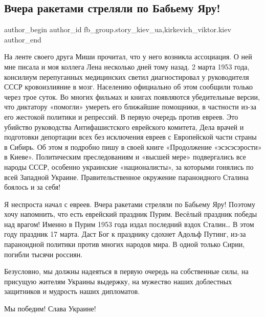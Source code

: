  
 
 
 
 
 
\subsection{Вчера ракетами стреляли по Бабьему Яру!}
\label{sec:02_02_2022.fb.fb_group.story_kiev_ua.2.babij_jar}
 
\ifcmt
 author_begin
   author_id fb_group.story_kiev_ua,kirkevich_viktor.kiev
 author_end
\fi


На ленте своего друга Миши прочитал, что у него возникла ассоциация. О ней мне
писала и моя коллега Лена несколько дней тому назад. 2 марта 1953 года,
консилиум перепуганных медицинских светил диагностировал у руководителя СССР
кровоизлияние в мозг. Населению официально об этом сообщили только через трое
суток. Во многих фильмах и книгах появляются убедительные версии, что диктатору
«помогли» умереть его ближайшие помощники, в частности из-за его жестокой
политики и репрессий. В первую очередь против евреев. Это убийство руководства
Антифашистского еврейского комитета, Дела врачей и подготовки депортации всех
без исключения евреев с Европейской части страны в Сибирь. Об этом я подробно
пишу в своей книге «Продолжение «эсэсэсэрости» в Киеве». Политическим
преследованиям и «высшей мере» подвергались все народы СССР, особенно
украинские «националисты», за которыми гонялись по всей Западной Украине.
Правительственное окружение параноидного Сталина боялось и за себя!

Я неспроста начал с евреев. Вчера ракетами стреляли по Бабьему Яру! Поэтому
хочу напомнить, что есть еврейский праздник Пурим. Весёлый праздник победы над
врагом! Именно в Пурим 1953 года издал последний вздох Сталин… В этом году
праздник 17 марта. Даст Бог к празднику сдохнет Адольф Путинг, из-за
параноидной политики против многих народов мира. В одной только Сирии, погибли
тысячи россиян.

Безусловно, мы должны надеяться в первую очередь на собственные силы, на
присущую жителям Украины выдержку, на мужество наших доблестных защитников и
мудрость наших дипломатов.

Мы победим! Слава Украине!
